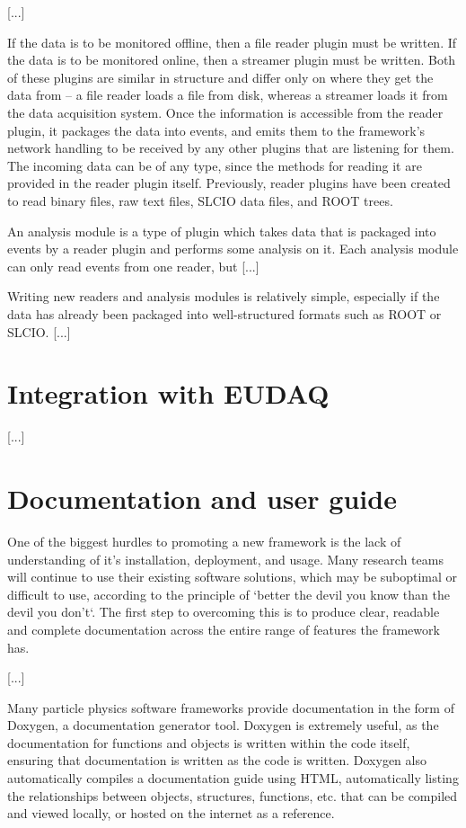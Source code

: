 [...]

If the data is to be monitored offline, then a file reader plugin must be written. If the data is to be monitored online, then a streamer plugin must be written. Both of these plugins are similar in structure and differ only on where they get the data from -- a file reader loads a file from disk, whereas a streamer loads it from the data acquisition system. Once the information is accessible from the reader plugin, it packages the data into events, and emits them to the framework's network handling to be received by any other plugins that are listening for them. The incoming data can be of any type, since the methods for reading it are provided in the reader plugin itself. Previously, reader plugins have been created to read binary files, raw text files, SLCIO data files, and ROOT trees.

An analysis module is a type of plugin which takes data that is packaged into events by a reader plugin and performs some analysis on it. Each analysis module can only read events from one reader, but [...] 

Writing new readers and analysis modules is relatively simple, especially if the data has already been packaged into well-structured formats such as ROOT or SLCIO. [...]


\section{Integration with EUDAQ}
[...]

\section{Documentation and user guide}

One of the biggest hurdles to promoting a new framework is the lack of understanding of it's installation, deployment, and usage. Many research teams will continue to use their existing software solutions, which may be suboptimal or difficult to use, according to the principle of `better the devil you know than the devil you don't`. The first step to overcoming this is to produce clear, readable and complete documentation across the entire range of features the framework has.

[...]

Many particle physics software frameworks provide documentation in the form of Doxygen, a documentation generator tool. Doxygen is extremely useful, as the documentation for functions and objects is written within the code itself, ensuring that documentation is written as the code is written. Doxygen also automatically compiles a documentation guide using HTML, automatically listing the relationships between objects, structures, functions, etc. that can be compiled and viewed locally, or hosted on the internet as a reference.

